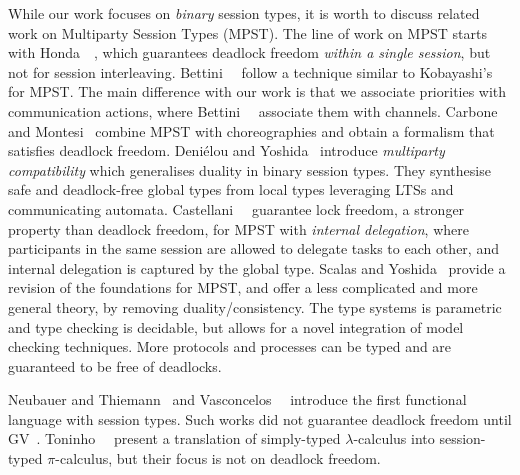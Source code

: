 While our work focuses on \emph{binary} session types, it is worth to discuss related work on Multiparty Session Types (MPST). The line of work on MPST starts with Honda~\etal~\cite{hondayoshida08}, which guarantees deadlock freedom \emph{within a single session}, but not for session interleaving.
Bettini~\etal~\cite{bettinicoppo08} follow a technique similar to Kobayashi's for MPST.
The main difference with our work is that we associate priorities with communication actions, where Bettini~\etal~\cite{bettinicoppo08} associate them with channels.
Carbone and Montesi~\cite{carbonemontesi13} combine MPST with choreographies and obtain a formalism that satisfies deadlock freedom.
Deni\'{e}lou and Yoshida~\cite{DenielouY13} introduce \emph{multiparty compatibility} which generalises duality in binary session types. They synthesise safe and deadlock-free global types from local types leveraging LTSs and communicating automata.
Castellani~\etal~\cite{CastellaniDGH20} guarantee lock freedom, a stronger property than deadlock freedom, for MPST with \emph{internal delegation}, where participants in the same session are allowed to delegate tasks to each other, and internal delegation is captured by the global type.
Scalas and Yoshida~\cite{scalasyoshida19} provide a revision of the foundations for MPST, and offer a less complicated and more general theory, by removing duality/consistency. The type systems is parametric and type checking is decidable, but allows for a novel integration of model checking techniques. More protocols and processes can be typed and are guaranteed to be free of deadlocks.

Neubauer and Thiemann~\cite{neubauert04} and Vasconcelos~\etal~\cite{vasconcelosravara04,vasconcelosgay06} introduce the first functional language with session types. Such works did not guarantee deadlock freedom until GV~\cite{lindleymorris15,wadler14}.
Toninho~\etal~\cite{toninhocaires12} present a translation of simply-typed $\lambda$-calculus into session-typed $\pi$-calculus, but their focus is not on deadlock freedom.

